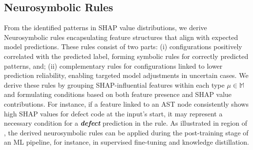 \subsection{Neurosymbolic Rules}
From the identified patterns in SHAP value distributions, we derive Neurosymbolic rules encapsulating feature structures that align with expected model predictions. These rules consist of two parts: (i) configurations positively correlated with the predicted label, forming symbolic rules for correctly predicted patterns, and; (ii) complementary rules for configurations linked to lower prediction reliability, enabling targeted model adjustments in uncertain cases. We derive these rules by grouping SHAP-influential features within each type $\mu \in \mathbb{M}$ and formulating conditions based on both feature presence and SHAP value contributions. For instance, if a feature linked to an AST node consistently shows high SHAP values for defect code at the input's start, it may represent a necessary condition for a \textbf{\textit{defect}} prediction in the rule. As illustrated in region  of , the derived neurosymbolic rules can be applied during the post-training stage of an ML pipeline, for instance, in supervised fine-tuning and knowledge distillation.